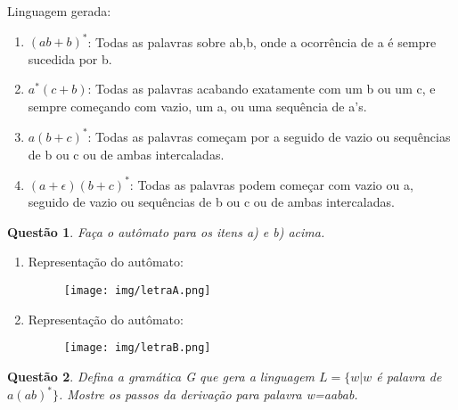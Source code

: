 \documentclass{article}
\newtheorem{problem}{Questão}
\begin{document}
\begin{solution} Linguagem gerada:
\begin{enumerate}[label=(\alph*)]
    \item $(ab+b)^{*}$: Todas as palavras sobre {ab,b}, onde a ocorrência de a é sempre sucedida por b.
    \item $a^{*}(c+b)$: Todas as palavras acabando exatamente com um b ou um c, e sempre começando com vazio, um a, ou uma sequência de a’s.
    \item $a(b+c)^{*}$: Todas as palavras começam por a seguido de vazio ou sequências de b ou c ou de  ambas intercaladas.
    \item $(a+\epsilon)(b+c)^{*}$: Todas as palavras podem começar com vazio ou a, seguido de vazio ou sequências de b ou c ou de  ambas intercaladas.
\end{enumerate}    
\end{solution}
 
\begin{problem} Faça o autômato para os itens a) e b) acima.
\end{problem}  

\begin{solution}
    \begin{enumerate}[label=(\alph*)]
        \item Representação do autômato:
            \begin{figure}[H]
            \centering
            \texttt{[image: img/letraA.png]}
        \end{figure}
        \item Representação do autômato:
            \begin{figure}[H]
            \centering
            \texttt{[image: img/letraB.png]}
        \end{figure}
    \end{enumerate}
\end{solution}

\begin{problem} Defina a gramática G que gera a linguagem $L = \{w | w$ é palavra de $a(ab)^{*}\}$. Mostre os passos
da derivação para palavra w=aabab.
\end{problem}
\end{document}
